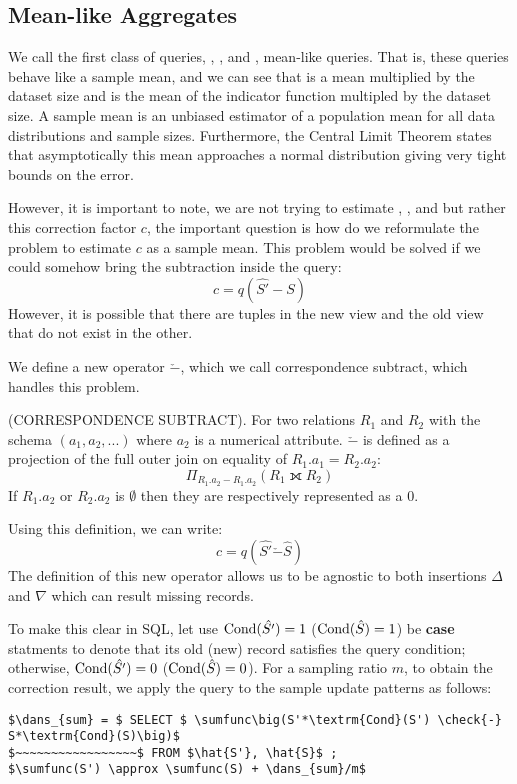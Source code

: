 \subsection{Mean-like Aggregates}
We call the first class of queries,  \sumfunc, \countfunc, and \avgfunc, mean-like queries.
That is, these queries behave like a sample mean, and we can see that \sumfunc is a mean multiplied by the dataset size and \countfunc is the mean of the indicator function multipled by the dataset size.
A sample mean is an unbiased estimator of a population mean for all data distributions and sample sizes.
Furthermore, the Central Limit Theorem states that asymptotically this mean approaches a normal distribution giving very tight bounds on the error.

However, it is important to note, we are not trying to estimate \sumfunc, \countfunc, and \avgfunc but rather this correction factor $c$, the important question is how do we reformulate the problem to estimate $c$ as a sample mean.
This problem would be solved if we could somehow bring the subtraction inside the query:
\[ c = q(\hat{S'} - S)\] 
However, it is possible that there are tuples in the new view and the old view that do not exist in the other.

We define a new operator $\check{-}$, which we call correspondence subtract, which handles this problem.
\begin{definition} (CORRESPONDENCE SUBTRACT). For two relations $R_1$ and $R_2$ with the schema $(a_1, a_2, ...)$ where 
$a_2$ is a numerical attribute. $\check{-}$ is defined as a projection of the full outer join on equality of $R_1.a_1 = R_2.a_2$: \[ \Pi_{R_1.a_2 - R_1.a_2} ( R_1 \fullouterjoin R_2 ) \]
 If $R_1.a_2$ or $R_2.a_2$ is $\emptyset$ then they are respectively represented as a $0$.
\end{definition}
Using this definition, we can write:
\[ c = q(\hat{S'} \check{-} \hat{S})\] 
The definition of this new operator allows us to be agnostic to both insertions $\Delta$ and $\nabla$ which can result missing records.

To make this clear in SQL, let use $\textrm{Cond}(\hat{S'})=1$ ($\textrm{Cond}(\hat{S})=1$) be \textbf{case} statments to denote that its old (new) record satisfies the query condition; otherwise, $\textrm{Cond}(\hat{S'})=0$ ($\textrm{Cond}(\hat{S})=0$). 
For a sampling ratio $m$, to obtain the correction result, we apply the query to the sample update patterns as follows:
\begin{lstlisting}[mathescape,basicstyle={\scriptsize}]
$\dans_{sum} = $ SELECT $ \sumfunc\big(S'*\textrm{Cond}(S') \check{-} S*\textrm{Cond}(S)\big)$ 
$~~~~~~~~~~~~~~~~~$ FROM $\hat{S'}, \hat{S}$ ;
$\sumfunc(S') \approx \sumfunc(S) + \dans_{sum}/m$
\end{lstlisting}

